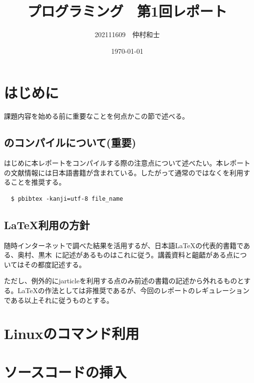 \documentclass[dvipdfmx,12pt,a4j]{jarticle}
\title{プログラミング　第1回レポート}
\author{202111609　仲村和士}
\date{\today}
\begin{document}
\maketitle
\section{はじめに}
課題内容を始める前に重要なことを何点かこの節で述べる。

\subsection{\BibTeX のコンパイルについて(重要)}
はじめに本レポートをコンパイルする際の注意点について述べたい。本レポートの文献情報には日本語書籍が含まれている。したがって通常の\BibTeX ではなく\pBibTeX を利用することを推奨する。
\begin{verbatim}
  $ pbibtex -kanji=utf-8 file_name
\end{verbatim}

\subsection{\LaTeX 利用の方針}
随時インターネットで調べた結果を活用するが、日本語\LaTeX の代表的書籍である、奥村、黒木~\cite{bibunsho}に記述があるものはこれに従う。講義資料と齟齬がある点についてはその都度記述する。

ただし、例外的にjarticleを利用する点のみ前述の書籍の記述から外れるものとする。\LaTeX の作法としては非推奨であるが、今回のレポートのレギュレーションである以上それに従うものとする。

\section{Linuxのコマンド利用}

\section{ソースコードの挿入}
\end{document}
